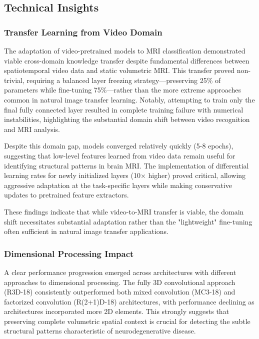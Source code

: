 \documentclass[12pt, a4paper]{article}
\begin{document}
\subsection{Technical Insights}

\subsubsection{Transfer Learning from Video Domain}

The adaptation of video-pretrained models to MRI classification demonstrated viable cross-domain knowledge transfer despite fundamental differences between spatiotemporal video data and static volumetric MRI. This transfer proved non-trivial, requiring a balanced layer freezing strategy—preserving 25\% of parameters while fine-tuning 75\%—rather than the more extreme approaches common in natural image transfer learning. Notably, attempting to train only the final fully connected layer resulted in complete training failure with numerical instabilities, highlighting the substantial domain shift between video recognition and MRI analysis.

Despite this domain gap, models converged relatively quickly (5-8 epochs), suggesting that low-level features learned from video data remain useful for identifying structural patterns in brain MRI. The implementation of differential learning rates for newly initialized layers (10× higher) proved critical, allowing aggressive adaptation at the task-specific layers while making conservative updates to pretrained feature extractors.

These findings indicate that while video-to-MRI transfer is viable, the domain shift necessitates substantial adaptation rather than the "lightweight" fine-tuning often sufficient in natural image transfer applications.

\subsubsection{Dimensional Processing Impact}

A clear performance progression emerged across architectures with different approaches to dimensional processing. The fully 3D convolutional approach (R3D-18) consistently outperformed both mixed convolution (MC3-18) and factorized convolution (R(2+1)D-18) architectures, with performance declining as architectures incorporated more 2D elements. This strongly suggests that preserving complete volumetric spatial context is crucial for detecting the subtle structural patterns characteristic of neurodegenerative disease.
\end{document}
